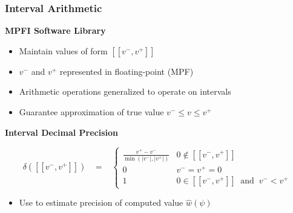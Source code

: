 \documentclass[t,pdf]{beamer}
\newcommand{\approximate}[1]{\hat{#1}}
\newcommand{\approxw}{\approximate{w}}
\newcommand{\aerror}{\delta}
\newcommand{\vmin}{v^{-}}
\newcommand{\vmax}{v^{+}}
\newcommand{\interval}[1]{[\![#1]\!]}
\begin{document}
\begin{frame}

\frametitle{Interval Arithmetic}

\medskip

\textbf{MPFI Software Library}
\begin{itemize}
\item Maintain values of form $\interval{\vmin, \vmax}$
\item $\vmin$ and $\vmax$ represented in floating-point (MPF)
\item Arithmetic operations generalized to operate on intervals
\item Guarantee approximation of true value $v^{-} \leq v \leq v^{+}$
\end{itemize}

\bigskip

\textbf{Interval Decimal Precision}

\begin{displaymath}
\aerror(\interval{\vmin, \vmax}) \;\;\; = \;\;\; \left\{ \begin{array}{ll}
  \frac{\vmax - \vmin}{\min(|\vmin|, |\vmax|)}  & 0 \not \in \interval{\vmin, \vmax}\\[0.8em]
  0 & \vmin = \vmax = 0 \\
  1 & 0 \in \interval{\vmin, \vmax} \;\; \textrm{and} \;\; \vmin < \vmax
  \end{array} \right. \label{eqn:interval:error}
\end{displaymath}

\begin{itemize}
  \item Use to estimate precision of computed value $\approxw(\psi)$
\end{itemize}

\end{frame}
\end{document}
